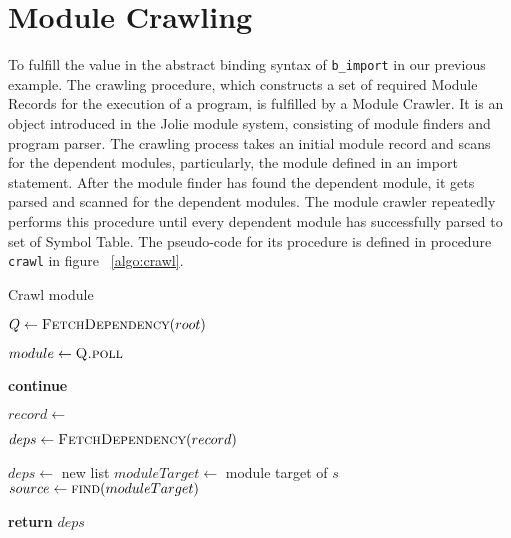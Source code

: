 \section{ Module Crawling }

To fulfill the value in the abstract binding syntax of \texttt{b_import} in our previous example. The crawling procedure, which constructs a set of required Module Records for the execution of a program, is fulfilled by a Module Crawler. It is an object introduced in the Jolie module system, consisting of module finders and program parser.
The crawling process takes an initial module record and scans for the dependent modules, particularly, the module defined in an import statement. After the module finder has found the dependent module, it gets parsed and scanned for the dependent modules. The module crawler repeatedly performs this procedure until every dependent module has successfully parsed to set of Symbol Table. The pseudo-code for its procedure is defined in procedure \texttt{crawl} in figure ~\ref{algo:crawl}.

\begin{algorithm}[h]
    \caption{Crawl module}
    \label{algo:crawl}
    \begin{algorithmic}[1]



        \State $Q\gets \Call{FetchDependency}{root}$ 
        \State {} 

        \State $module\gets \Call{Q.poll}{}$

        \textbf{continue} 
        \EndIf

        \State $record\gets$  

        \State $deps\gets \Call{FetchDependency}{record}$
        \State {}
        \EndIf
        \EndFor
        \State {} 

        \EndWhile
        \EndProcedure



        \State $deps\gets$ new list
        \State $moduleTarget\gets$ module target of $s$
        \State $source\gets \Call{find}{moduleTarget}$ 

        \State {}
        \EndFor

        \State \textbf{return} $deps$ 
        \EndFunction

    \end{algorithmic}
\end{algorithm}
\FloatBarrier

